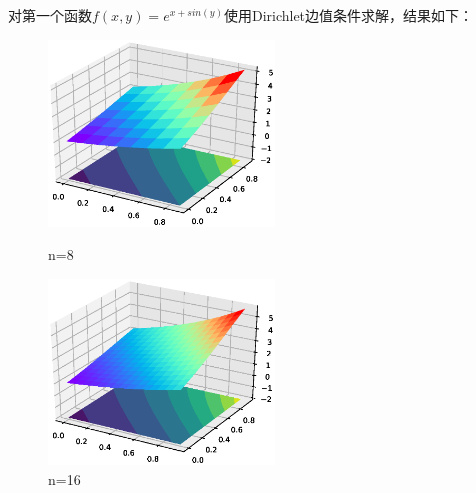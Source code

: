 \documentclass[12]{article}%
\begin{document}
对第一个函数$f(x,y)=e^{x+sin(y)}$使用Dirichlet边值条件求解，结果如下：
\begin{figure}[H]
    \centering
    \begin{minipage}[t]{0.48\textwidth}
    \centering
    \includegraphics[width=6cm]{../pic/fun18.eps}
    \caption{n=8}
    \end{minipage}
    \begin{minipage}[t]{0.48\textwidth}
    \centering
    \includegraphics[width=6cm]{../pic/fun116.eps}
    \caption{n=16}
    \end{minipage}
\end{figure}
\end{document}
